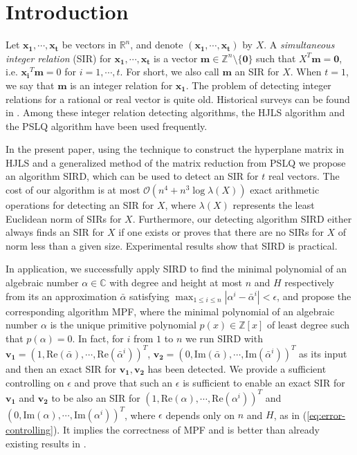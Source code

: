 \documentclass{sig-alternate}
\numberwithin{theorem}{section} \numberwithin{equation}{section}
\begin{document}
\section{Introduction}
\label{sec:introduction}

Let
 $\mathbf{x_1}, \cdots, \mathbf{x_t}$ be vectors in $\mathbb{R}^n$,
and denote $(\mathbf{x_1}, \cdots, \mathbf{x_t})$ by $X$. A
\emph{simultaneous integer relation} (SIR) for $\mathbf{x_1},
\cdots, \mathbf{x_t}$ is a vector $\mathbf{m} \in
\mathbb{Z}^{n}\setminus\{\textbf{0}\}$ such that $X^T\mathbf{m} =
\textbf{0}$, i.e. $\mathbf{x_i}^T\mathbf{m} = 0$ for $i = 1,\cdots,
t$. For short, we also call $\mathbf{m}$  an SIR for $X$. When $t =
1$, we say that $\mathbf{m}$ is an integer relation for
$\mathbf{x_1}$.
The problem of detecting integer relations for a rational or real vector is quite old.
Historical surveys can be found in \cite{Ber1971, FF1979,
Bre1982, HJL1989, FBA1999}. Among these integer relation detecting
algorithms, the HJLS algorithm \cite{HHL1986, HJL1989} and the PSLQ
algorithm \cite{FB1992, FBA1999} have been used frequently.

In the present paper, using  the technique to construct the
hyperplane matrix in HJLS and a generalized method of the matrix
reduction from PSLQ we propose an algorithm SIRD, which can be
used to detect an SIR for $t$ real vectors. The cost of our algorithm is at most $\mathcal {O}(n^4 + n^3 \log
\lambda(X))$ exact arithmetic operations for detecting an SIR for
$X$, where $\lambda(X)$ represents the least Euclidean norm of SIRs
for $X$. Furthermore, our detecting algorithm SIRD  either always
finds an SIR for $X$ if one exists or proves that there are no SIRs
for $X$ of norm less than a given size. Experimental results show
that SIRD is practical.

In application, we successfully apply  SIRD to find the minimal
polynomial of an algebraic number $\alpha \in \mathbb{C}$ with
degree and height at most $n$ and $H$ respectively from its an
approximation $\bar{\alpha}$ satisfying $\max_{1\leq i\leq
n}|\alpha^{i}-\bar{\alpha}^i| < \epsilon$, and propose the
corresponding algorithm MPF, where  the
minimal polynomial of an algebraic number $\alpha$ is the unique
primitive polynomial $p(x) \in \mathbb{Z}[x]$ of least degree such
that $p(\alpha)  =
 0$.
In fact, for $i$ from $1$ to $n$ we run  SIRD with
$\mathbf{v_1}=(1,\mbox{Re}(\bar{\alpha}),\cdots,\mbox{Re}(\bar{\alpha}^i))^T$,
$\mathbf{v_2} = (0, \mbox{Im}(\bar{\alpha}), \cdots,
\mbox{Im}(\bar{\alpha}^i))^T$ as its input and then an exact SIR for
$\mathbf{v_1}, \mathbf{v_2}$ has been detected. We provide  a sufficient controlling on $\epsilon$ and prove that
such an $\epsilon$ is sufficient to enable an exact SIR for
$\mathbf{v_1}$ and $\mathbf{v_2}$ to be also an SIR for
$(1,\mbox{Re}(\alpha),\cdots,\mbox{Re}(\alpha^i))^T$ and $(0,
\mbox{Im}(\alpha), \cdots, \mbox{Im}(\alpha^i))^T$,
where $\epsilon$ depends only on $n$ and $H$, as in
(\ref{eq:error-controlling}). It implies the correctness of MPF and
is better than already existing results in \cite{Jus1989,QFC2009}.
\end{document}

